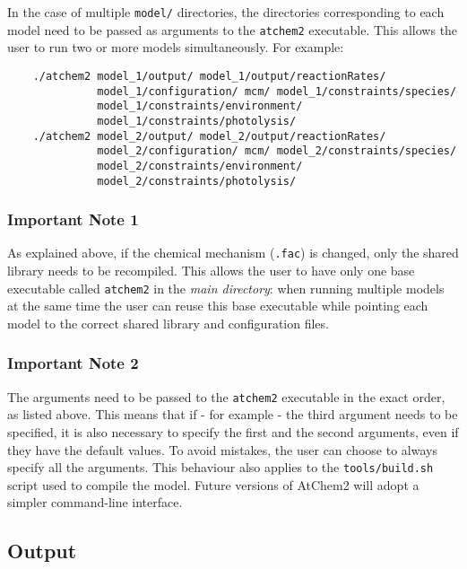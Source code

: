 In the case of multiple \texttt{model/} directories, the directories
corresponding to each model need to be passed as arguments to the
\texttt{atchem2} executable. This allows the user to run two or more
models simultaneously. For example:

\begin{verbatim}
    ./atchem2 model_1/output/ model_1/output/reactionRates/
              model_1/configuration/ mcm/ model_1/constraints/species/
              model_1/constraints/environment/
              model_1/constraints/photolysis/
    ./atchem2 model_2/output/ model_2/output/reactionRates/
              model_2/configuration/ mcm/ model_2/constraints/species/
              model_2/constraints/environment/
              model_2/constraints/photolysis/
\end{verbatim}

\subsubsection{Important Note 1} \label{important-note-1}

As explained above, if the chemical mechanism (\texttt{.fac}) is
changed, only the shared library needs to be recompiled. This allows
the user to have only one base executable called \texttt{atchem2} in
the \emph{main directory}: when running multiple models at the same
time the user can reuse this base executable while pointing each model
to the correct shared library and configuration files.

\subsubsection{Important Note 2} \label{important-note-2}

The arguments need to be passed to the \texttt{atchem2} executable in
the exact order, as listed above. This means that if - for example -
the third argument needs to be specified, it is also necessary to
specify the first and the second arguments, even if they have the
default values. To avoid mistakes, the user can choose to always
specify all the arguments. This behaviour also applies to the
\texttt{tools/build.sh} script used to compile the model. Future
versions of AtChem2 will adopt a simpler command-line interface.

\subsection{Output} \label{subsec:output}


